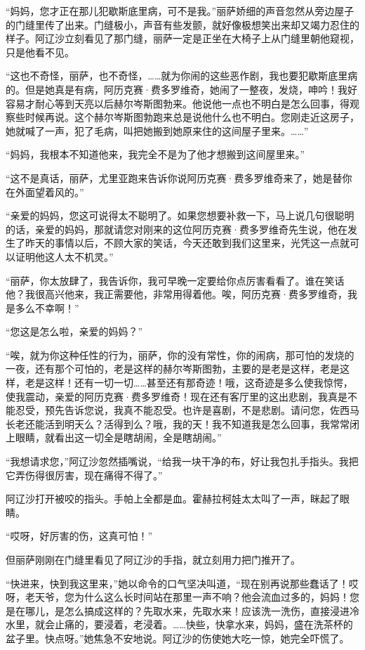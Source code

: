\par “妈妈，您才正在那儿犯歇斯底里病，可不是我。”丽萨娇细的声音忽然从旁边屋子的门缝里传了出来。门缝极小，声音有些发颤，就好像极想笑出来却又竭力忍住的样子。阿辽沙立刻看见了那门缝，丽萨一定是正坐在大椅子上从门缝里朝他窥视，只是他看不见。
\par “这也不奇怪，丽萨，也不奇怪，……就为你闹的这些恶作剧，我也要犯歇斯底里病的。但是她真是有病，阿历克赛·费多罗维奇，她闹了一整夜，发烧，呻吟！我好容易才耐心等到天亮以后赫尔岑斯图勃来。他说他一点也不明白是怎么回事，得观察些时候再说。这个赫尔岑斯图勃跑来总是说他什么也不明白。您刚走近这房子，她就喊了一声，犯了毛病，叫把她搬到她原来住的这间屋子里来。……”
\par “妈妈，我根本不知道他来，我完全不是为了他才想搬到这间屋里来。”
\par “这不是真话，丽萨，尤里亚跑来告诉你说阿历克赛·费多罗维奇来了，她是替你在外面望着风的。”
\par “亲爱的妈妈，您这可说得太不聪明了。如果您想要补救一下，马上说几句很聪明的话，亲爱的妈妈，那就请您对刚来的这位阿历克赛·费多罗维奇先生说，他在发生了昨天的事情以后，不顾大家的笑话，今天还敢到我们这里来，光凭这一点就可以证明他这人太不机灵。”
\par “丽萨，你太放肆了，我告诉你，我可早晚一定要给你点厉害看看了。谁在笑话他？我很高兴他来，我正需要他，非常用得着他。唉，阿历克赛·费多罗维奇，我是多么不幸啊！”
\par “您这是怎么啦，亲爱的妈妈？”
\par “唉，就为你这种任性的行为，丽萨，你的没有常性，你的闹病，那可怕的发烧的一夜，还有那个可怕的，老是这样的赫尔岑斯图勃，主要的是老是这样，老是这样，老是这样！还有一切一切……甚至还有那奇迹！哦，这奇迹是多么使我惊愕，使我震动，亲爱的阿历克赛·费多罗维奇！现在还有客厅里的这出悲剧，我真是不能忍受，预先告诉您说，我真不能忍受。也许是喜剧，不是悲剧。请问您，佐西马长老还能活到明天么？活得到么？哦，我的天！我不知道我是怎么回事，我常常闭上眼睛，就看出这一切全是瞎胡闹，全是瞎胡闹。”
\par “我想请求您，”阿辽沙忽然插嘴说，“给我一块干净的布，好让我包扎手指头。我把它弄伤得很厉害，现在痛得不得了。”
\par 阿辽沙打开被咬的指头。手帕上全都是血。霍赫拉柯娃太太叫了一声，眯起了眼睛。
\par “哎呀，好厉害的伤，这真可怕！”
\par 但丽萨刚刚在门缝里看见了阿辽沙的手指，就立刻用力把门推开了。
\par “快进来，快到我这里来，”她以命令的口气坚决叫道，“现在别再说那些蠢话了！哎呀，老天爷，您为什么这么长时间站在那里一声不响？他会流血过多的，妈妈！您是在哪儿，是怎么搞成这样的？先取水来，先取水来！应该洗一洗伤，直接浸进冷水里，就会止痛的，要浸着，老浸着。……快些，快拿水来，妈妈，盛在洗茶杯的盆子里。快点呀。”她焦急不安地说。阿辽沙的伤使她大吃一惊，她完全吓慌了。
